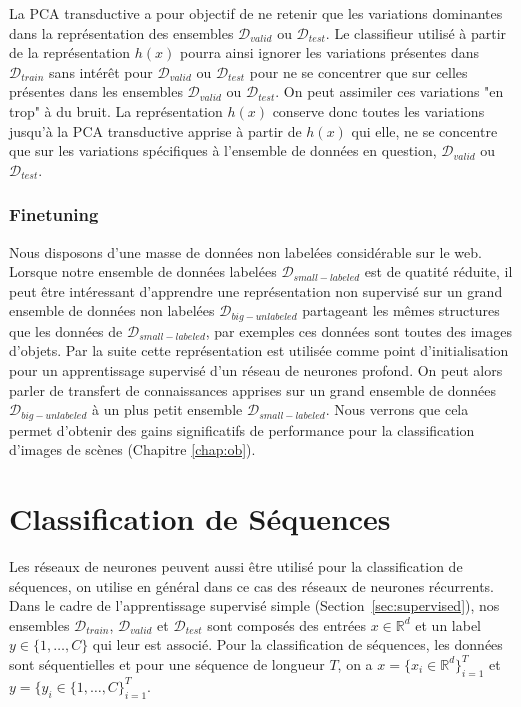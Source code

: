 La PCA transductive a pour objectif de ne retenir que les variations dominantes
dans la représentation des ensembles $\mathcal{D}_{valid}$ ou
$\mathcal{D}_{test}$. Le classifieur utilisé à partir de la représentation
$h(x)$ pourra ainsi ignorer les variations présentes dans $\mathcal{D}_{train}$
sans intérêt pour $\mathcal{D}_{valid}$ ou $\mathcal{D}_{test}$ pour ne se
concentrer que sur celles présentes dans les ensembles $\mathcal{D}_{valid}$ ou
$\mathcal{D}_{test}$. On peut assimiler ces variations "en trop" à du bruit. La
représentation $h(x)$ conserve donc toutes les variations jusqu'à la PCA
transductive apprise à partir de $h(x)$ qui elle, ne se concentre que sur les
variations spécifiques à l'ensemble de données en question,
$\mathcal{D}_{valid}$ ou $\mathcal{D}_{test}$. 

\subsubsection{Finetuning}

Nous disposons d'une masse de données non labelées considérable sur le web.
Lorsque notre ensemble de données labelées $\mathcal{D}_{small-labeled}$ est de
quatité réduite, il peut être intéressant d'apprendre une représentation non
supervisé sur un grand ensemble de données non labelées
$\mathcal{D}_{big-unlabeled}$ partageant les mêmes structures que les données
de $\mathcal{D}_{small-labeled}$, par exemples ces données sont toutes des
images d'objets. Par la suite cette représentation est utilisée comme point
d'initialisation pour un apprentissage supervisé d'un réseau de neurones
profond. On peut alors parler de transfert de connaissances apprises sur un
grand ensemble de données $\mathcal{D}_{big-unlabeled}$ à un plus petit
ensemble $\mathcal{D}_{small-labeled}$.  Nous verrons que cela permet d'obtenir
des gains significatifs de performance pour la classification d'images de
scènes (Chapitre \ref{chap:ob}).

\section{Classification de Séquences}

Les réseaux de neurones peuvent aussi être utilisé pour la classification de
séquences, on utilise en général dans ce cas des réseaux de neurones récurrents.
Dans le cadre de l'apprentissage supervisé simple
(Section~\ref{sec:supervised}), nos ensembles $\mathcal{D}_{train}$,
$\mathcal{D}_{valid}$ et  $\mathcal{D}_{test}$  sont composés des entrées
$x\in\mathbb{R}^{d}$ et un label $y\in\{1,\dots ,C\}$ qui leur est associé.
Pour la classification de séquences, les données sont séquentielles et pour une
séquence de longueur $T$, on a $x=\lbrace x_{i}\in\mathbb{R}^{d}
\rbrace_{i=1}^{T}$ et $y=\lbrace y_{i}\in\{1,\dots ,C\}_{i=1}^{T}$.

